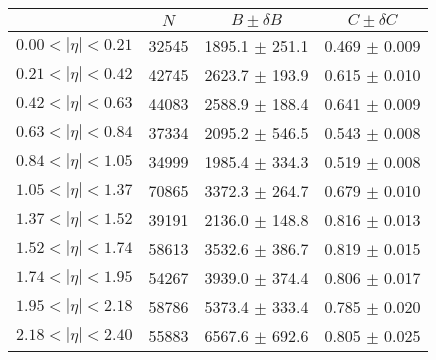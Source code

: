 \begin{tabular}{lccc}
\hline
    &   $N$   & $B \pm \delta B$  &  $C \pm \delta C$ \\
\hline
$0.00 < |\eta| <0.21$          & 32545      & 1895.1     $\pm$ 251.1 & 0.469      $\pm$ 0.009 \\
$0.21 < |\eta| <0.42$          & 42745      & 2623.7     $\pm$ 193.9 & 0.615      $\pm$ 0.010 \\
$0.42 < |\eta| <0.63$          & 44083      & 2588.9     $\pm$ 188.4 & 0.641      $\pm$ 0.009 \\
$0.63 < |\eta| <0.84$          & 37334      & 2095.2     $\pm$ 546.5 & 0.543      $\pm$ 0.008 \\
$0.84 < |\eta| <1.05$          & 34999      & 1985.4     $\pm$ 334.3 & 0.519      $\pm$ 0.008 \\
$1.05 < |\eta| <1.37$          & 70865      & 3372.3     $\pm$ 264.7 & 0.679      $\pm$ 0.010 \\
$1.37 < |\eta| <1.52$          & 39191      & 2136.0     $\pm$ 148.8 & 0.816      $\pm$ 0.013 \\
$1.52 < |\eta| <1.74$          & 58613      & 3532.6     $\pm$ 386.7 & 0.819      $\pm$ 0.015 \\
$1.74 < |\eta| <1.95$          & 54267      & 3939.0     $\pm$ 374.4 & 0.806      $\pm$ 0.017 \\
$1.95 < |\eta| <2.18$          & 58786      & 5373.4     $\pm$ 333.4 & 0.785      $\pm$ 0.020 \\
$2.18 < |\eta| <2.40$          & 55883      & 6567.6     $\pm$ 692.6 & 0.805      $\pm$ 0.025 \\
\hline
\end{tabular}
